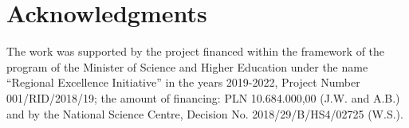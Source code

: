 \documentclass[final,5p,times,twocolumn,authoryear]{elsarticle}
\begin{document}
\section*{Acknowledgments}
The work was supported by the project financed within the framework of the program of the Minister of Science and Higher Education under the name “Regional Excellence Initiative” in the years 2019-2022, Project Number 001/RID/2018/19; the amount of financing: PLN 10.684.000,00 (J.W. and A.B.) and by the National Science Centre, Decision No. 2018/29/B/HS4/02725 (W.S.).


\end{document}
